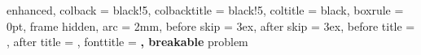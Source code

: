 %
  {enhanced,
   colback        = black!5,
   colbacktitle   = black!5,
   coltitle       = black,
   boxrule        = 0pt,
   frame hidden,
   arc            = 2mm,
   before skip    = 3ex,
   after skip     = 3ex,
   before title   = {\vspace{2mm}},
   after title    = {\vspace{2mm}},
   fonttitle      = \bfseries\sffamily,
   breakable
  }{problem}
